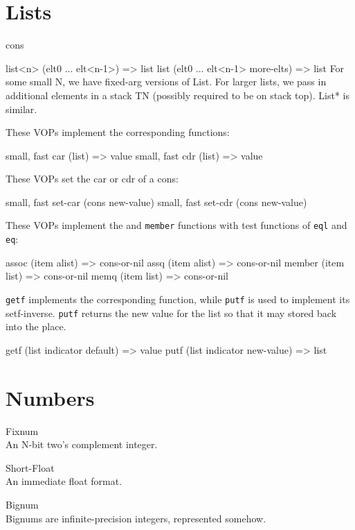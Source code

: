 {
\chapter{Lists}


cons

\begin{example}
list<n> (elt0 ... elt<n-1>) => list
list (elt0 ... elt<n-1> more-elts) => list
    For some small N, we have fixed-arg versions of List.  For larger lists, we
    pass in additional elements in a stack TN (possibly required to be on stack
    top).  List* is similar.
\end{example}

These VOPs implement the corresponding \clisp functions:
\begin{example}
{small, fast} car (list) => value 
{small, fast} cdr (list) => value 
\end{example}

These VOPs set the car or cdr of a cons:
\begin{example}
{small, fast} set-car (cons new-value)
{small, fast} set-cdr (cons new-value)
\end{example}

These VOPs implement the  and {\tt member} functions with test
functions of {\tt eql} and {\tt eq}:
\begin{example}
assoc (item alist) => cons-or-nil
assq (item alist) => cons-or-nil
member (item list) => cons-or-nil
memq (item list) => cons-or-nil
\end{example}


{\tt getf} implements the corresponding \clisp function, while {\tt putf} is used
to implement its setf-inverse.  {\tt putf} returns the new value for the list so
that it may stored back into the place.
\begin{example}
getf (list indicator default) => value
putf (list indicator new-value) => list
\end{example}


\chapter{Numbers}

Fixnum\\An N-bit two's complement integer.

Short-Float\\An immediate float format.

\label{Bignums}
Bignum\\Bignums are infinite-precision integers, represented somehow.

}
